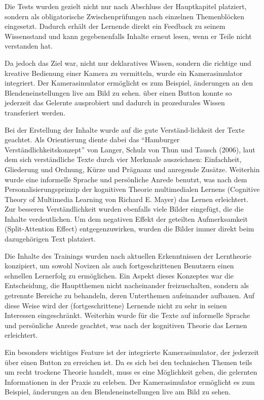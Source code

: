 \documentclass{article}
\begin{document}
Die Tests wurden gezielt nicht nur nach Abschluss der Hauptkapitel platziert, sondern als obligatorische Zwischenpr\"ufungen nach einzelnen Themenbl\"ocken eingesetzt. Dadurch erh\"alt der Lernende direkt ein Feedback zu seinem Wissensstand und kann gegebenenfalls Inhalte erneut lesen, wenn er Teile nicht verstanden hat.

Da jedoch das Ziel war, nicht nur deklaratives Wissen, sondern die richtige und kreative Bedienung einer Kamera zu vermitteln, wurde ein Kamerasimulator integriert. Der Kamerasimulator erm\"oglicht es zum Beispiel, \"anderungen an den Blendeneinstellungen live am Bild zu sehen. \"uber einen Button konnte so jederzeit das Gelernte ausprobiert und dadurch in prozedurales Wissen transferiert werden. 

Bei der Erstellung der Inhalte wurde auf die gute Verst\"and-lichkeit der Texte geachtet. Als Orientierung diente dabei das ``Hamburger Verst\"andlichkeitskonzept'' von Langer, Schulz von Thun und Tausch (2006)\cite{rey2009e-learning}, laut dem sich verst\"andliche Texte durch vier Merkmale auszeichnen: Einfachheit, Gliederung und Ordnung, K\"urze und Pr\"agnanz und anregende Zus\"atze. Weiterhin wurde eine informelle Sprache und pers\"onliche Anrede benutzt, was nach dem Personalisierungsprinzip der kognitiven Theorie multimedialen Lernens (Cognitive Theory of Multimedia Learning von Richard E. Mayer) das Lernen erleichtert. 
Zur besseren Verst\"andlichkeit wurden ebenfalls viele Bilder eingef\"ugt, die die Inhalte verdeutlichen. Um dem negativen Effekt der geteilten Aufmerksamkeit (Split-Attention Effect) entgegenzuwirken, wurden die Bilder immer direkt beim dazugeh\"origen Text platziert. 


Die Inhalte des Trainings wurden nach aktuellen Erkenntnissen der Lerntheorie konzipiert, um sowohl Novizen als auch fortgeschrittenen Benutzern einen schnellen Lernerfolg zu erm\"oglichen.
Ein Aspekt dieses Konzeptes war die Entscheidung, die Hauptthemen nicht nacheinander freizuschalten, sondern als getrennte Bereiche zu behandeln, deren Unterthemen aufeinander aufbauen. Auf diese Weise wird der (fortgeschrittene) Lernende nicht zu sehr in seinen Interessen eingeschr\"ankt.
Weiterhin wurde f\"ur die Texte auf informelle Sprache und pers\"onliche Anrede geachtet, was nach der kognitiven Theorie das Lernen erleichtert.

Ein besonders wichtiges Feature ist der integrierte Kamerasimulator, der jederzeit \"uber einen Button zu erreichen ist. Da es sich bei den technischen Themen teils um recht trockene Theorie handelt, muss es eine M\"oglichkeit geben, die gelernten Informationen in der Praxis zu erleben. Der Kamerasimulator erm\"oglicht es zum Beispiel, \"anderungen an den Blendeneinstellungen live am Bild zu sehen.
\end{document}
